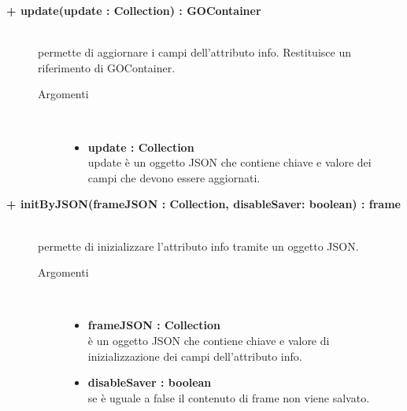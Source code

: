 \begin{description}
\begin{description}
\end{description}

\begin{description}
		\item[\textbf{\color{blue}+ update(update : Collection) : GOContainer			}] \hfill \\
			permette di aggiornare i campi dell'attributo info. Restituisce un riferimento di GOContainer.
			
		\begin{description}
			\item[Argomenti] \hfill \\
				\begin{itemize}
				
					\item \textbf{update : Collection			} \hfill \\
					update è un oggetto JSON che contiene chiave e valore dei campi che devono essere aggiornati. 
				\end{itemize}
		\end{description}

\end{description}

\begin{description}
		\item[\textbf{\color{blue}+ initByJSON(frameJSON : Collection, disableSaver: boolean) : frame			}] \hfill \\
			permette di inizializzare l'attributo info tramite un oggetto JSON. 
			
		\begin{description}
			\item[Argomenti] \hfill \\
				\begin{itemize}
				
					\item \textbf{frameJSON : Collection			} \hfill \\
					è un oggetto JSON che contiene chiave e valore di inizializzazione dei campi dell'attributo info. 
					\item \textbf{disableSaver : boolean			} \hfill \\
					se è uguale a false il contenuto di frame non viene salvato. %
				\end{itemize}
		\end{description}

\end{description}


\end{description}

